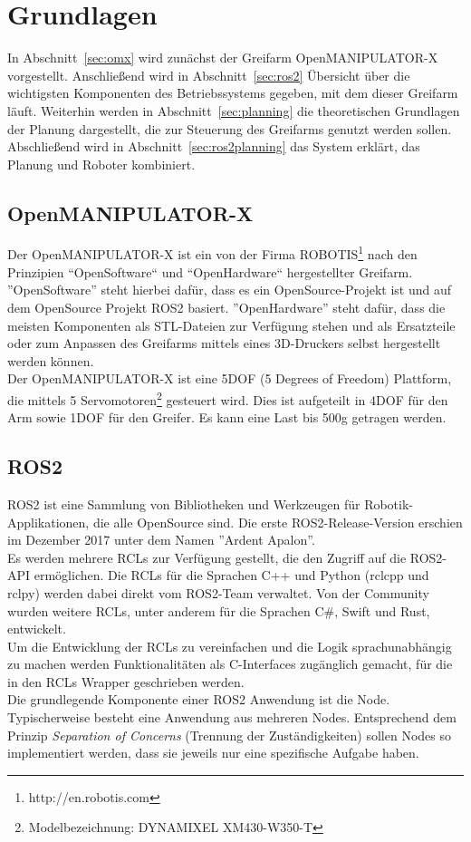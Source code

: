 \section {Grundlagen}
In Abschnitt~\ref{sec:omx} wird zunächst der Greifarm OpenMANIPULATOR-X vorgestellt.
Anschließend wird in Abschnitt~\ref{sec:ros2} Übersicht über die wichtigsten Komponenten des Betriebssystems gegeben, mit dem dieser Greifarm läuft.
Weiterhin werden in Abschnitt~\ref{sec:planning} die theoretischen Grundlagen der Planung dargestellt, die zur Steuerung des Greifarms genutzt werden sollen.
Abschließend wird in Abschnitt~\ref{sec:ros2planning} das System erklärt, das Planung und Roboter kombiniert.
\subsection{OpenMANIPULATOR-X}{\label{sec:omx}}
Der OpenMANIPULATOR-X ist ein von der Firma ROBOTIS{\footnote{http://en.robotis.com}} nach den Prinzipien ``OpenSoftware`` und ``OpenHardware`` hergestellter Greifarm.
''OpenSoftware'' steht hierbei dafür, dass es ein OpenSource-Projekt ist und auf dem OpenSource Projekt \ac{ROS2} basiert.
''OpenHardware'' steht dafür, dass die meisten Komponenten als STL-Dateien zur Verfügung stehen und als Ersatzteile oder zum Anpassen des Greifarms mittels eines 3D-Druckers selbst hergestellt werden können.\\
Der OpenMANIPULATOR-X ist eine 5DOF (5 Degrees of Freedom) Plattform, die mittels 5 Servomotoren{\footnote{Modelbezeichnung: DYNAMIXEL XM430-W350-T}} gesteuert wird.
Dies ist aufgeteilt in 4DOF für den Arm sowie 1DOF für den Greifer.
Es kann eine Last bis 500g getragen werden.
\subsection{ROS2}{\label{sec:ros2}}
\acf{ROS2} ist eine Sammlung von Bibliotheken und Werkzeugen für Robotik-Applikationen, die alle OpenSource sind.
Die erste \ac{ROS2}-Release-Version erschien im Dezember 2017 unter dem Namen ''Ardent Apalon''.\\
Es werden  mehrere \acp{RCL}  zur Verfügung gestellt, die den Zugriff auf die \ac{ROS2}-API ermöglichen.
Die \acp{RCL} für die Sprachen C++ und Python (rclcpp und rclpy) werden dabei direkt vom \ac{ROS2}-Team verwaltet.
Von der Community wurden weitere \acp{RCL}, unter anderem für die Sprachen C\#, Swift und Rust, entwickelt.\\
Um die Entwicklung der \acp{RCL} zu vereinfachen und die Logik sprachunabhängig zu machen werden Funktionalitäten als C-Interfaces zugänglich gemacht, für die in den \acp{RCL} Wrapper geschrieben werden.\\
Die grundlegende Komponente einer \ac{ROS2} Anwendung ist die Node.
Typischerweise besteht eine Anwendung aus mehreren Nodes.
Entsprechend dem Prinzip \emph{Separation of Concerns} (Trennung der Zuständigkeiten) sollen Nodes so implementiert werden, dass sie jeweils nur eine spezifische Aufgabe haben.

